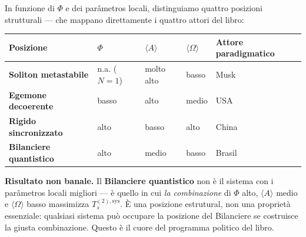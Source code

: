 In funzione di \(\Phi\) e dei parâmetros locali, distinguiamo quattro
posizioni strutturali --- che mappano direttamente i quattro attori del
libro:

{\def\LTcaptype{none} %
{\small\begin{longtable}[]{@{}
  >{\raggedright\arraybackslash}p{}
  >{\raggedright\arraybackslash}p{}
  >{\raggedright\arraybackslash}p{}
  >{\raggedright\arraybackslash}p{}
  >{\raggedright\arraybackslash}p{}@{}}
\toprule\noalign{}
\begin{minipage}[b]{\linewidth}\raggedright
Posizione
\end{minipage} & \begin{minipage}[b]{\linewidth}\raggedright
\(\Phi\)
\end{minipage} & \begin{minipage}[b]{\linewidth}\raggedright
\(\langle A\rangle\)
\end{minipage} & \begin{minipage}[b]{\linewidth}\raggedright
\(\langle\Omega\rangle\)
\end{minipage} & \begin{minipage}[b]{\linewidth}\raggedright
Attore paradigmatico
\end{minipage} \\
\midrule\noalign{}
\endhead
\bottomrule\noalign{}
\endlastfoot
\textbf{Soliton metastabile} & n.a. (\(N=1\)) & molto alto & basso &
Musk \\
\textbf{Egemone decoerente} & basso & alto & medio & USA \\
\textbf{Rigido sincronizzato} & alto & basso & alto & China \\
\textbf{Bilanciere quantistico} & alto & medio & basso & Brasil \\
\end{longtable}}
}

\Proved{} \textbf{Risultato non banale.} Il \textbf{Bilanciere
quantistico} non è il sistema con i parâmetros locali migliori --- è
quello in cui \emph{la combinazione} di \(\Phi\) alto,
\(\langle A\rangle\) medio e \(\langle\Omega\rangle\) basso massimizza
\(T_s^{(2),\text{sys}}\). È una posizione estrutural, non una proprietà
essenziale: qualsiasi sistema può occupare la posizione del Bilanciere
se costruisce la giusta combinazione. Questo è il cuore del programma
politico del libro.



